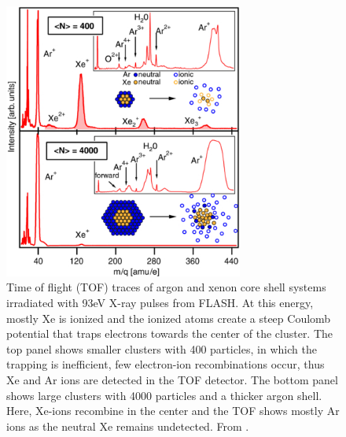 \begin{figure}
	\centering
		\includegraphics[width=0.70\textwidth]{images/Hoener-image.jpg}
	\caption[Time of flight spectra of argon and xenon core-shell systems.]{Time of flight (TOF) traces of argon and xenon core shell systems irradiated with 93eV X-ray pulses from FLASH. At this energy, mostly Xe is ionized and the ionized atoms create a steep Coulomb potential that traps electrons towards the center of the cluster. The top panel shows smaller clusters with 400 particles, in which the trapping is inefficient, few electron-ion recombinations occur, thus Xe and Ar ions are detected in the TOF detector. The bottom panel shows large clusters with 4000 particles and a thicker argon shell. Here, Xe-ions recombine in the center and the TOF shows mostly Ar ions as the neutral Xe remains undetected. From \citep[\href{https://creativecommons.org/licenses/by/3.0/}{\ccby}]{Hoener-2008-JPB}.}
	\label{fig:Hoener-image}
\end{figure}
